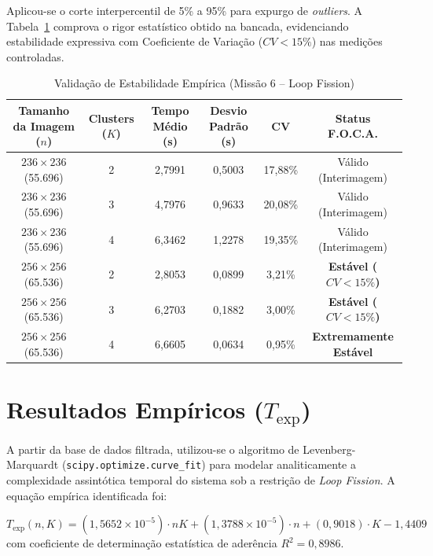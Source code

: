 \documentclass[11pt,a4paper]{article}
\begin{document}
Aplicou-se o corte interpercentil de 5\% a 95\% para expurgo de \textit{outliers}. A Tabela~\ref{tab:estabilidade} comprova o rigor estat\'{i}stico obtido na bancada, evidenciando estabilidade expressiva com Coeficiente de Varia\c{c}\~{a}o ($CV < 15\%$) nas medi\c{c}\~{o}es controladas.

\begin{table}[h!]
\centering
\caption{Valida\c{c}\~{a}o de Estabilidade Emp\'{i}rica (Miss\~{a}o 6 -- Loop Fission)}
\label{tab:estabilidade}
\begin{tabular}{@{}cccccc@{}}
\toprule
\textbf{Tamanho da Imagem ($n$)} & \textbf{Clusters ($K$)} & \textbf{Tempo M\'{e}dio (s)} & \textbf{Desvio Padr\~{a}o (s)} & \textbf{CV} & \textbf{Status F.O.C.A.} \\ \midrule
$236 \times 236$ (55.696) & 2 & 2,7991 & 0,5003 & 17,88\% & V\'{a}lido (Interimagem) \\
$236 \times 236$ (55.696) & 3 & 4,7976 & 0,9633 & 20,08\% & V\'{a}lido (Interimagem) \\
$236 \times 236$ (55.696) & 4 & 6,3462 & 1,2278 & 19,35\% & V\'{a}lido (Interimagem) \\
$256 \times 256$ (65.536) & 2 & 2,8053 & 0,0899 & 3,21\%  & \textbf{Est\'{a}vel ($CV < 15\%$)} \\
$256 \times 256$ (65.536) & 3 & 6,2703 & 0,1882 & 3,00\%  & \textbf{Est\'{a}vel ($CV < 15\%$)} \\
$256 \times 256$ (65.536) & 4 & 6,6605 & 0,0634 & 0,95\%  & \textbf{Extremamente Est\'{a}vel} \\ \bottomrule
\end{tabular}
\end{table}

\section{Resultados Emp\'{i}ricos ($T_{\text{exp}}$)}
A partir da base de dados filtrada, utilizou-se o algoritmo de Levenberg-Marquardt (\texttt{scipy.optimize.curve\_fit}) para modelar analiticamente a complexidade assint\'{o}tica temporal do sistema sob a restri\c{c}\~{a}o de \textit{Loop Fission}. A equa\c{c}\~{a}o emp\'{i}rica identificada foi:

\begin{equation}
T_{\text{exp}}(n, K) = (1{,}5652 \times 10^{-5}) \cdot nK + (1{,}3788 \times 10^{-5}) \cdot n + (0{,}9018) \cdot K - 1{,}4409
\label{eq:missao6}
\end{equation}
com coeficiente de determina\c{c}\~{a}o estat\'{i}stica de ader\^{e}ncia \textbf{$R^2 = 0{,}8986$}.
\end{document}
